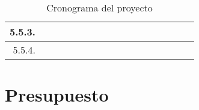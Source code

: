 \documentclass[12pt]{article}
\begin{document}
\begin{table}[H]
{\begin{tabular}{|rllllllllllllllll|}
			\multicolumn{1}{|r|}{5.5.3.}                                       & \multicolumn{1}{l|}{}                          & \multicolumn{1}{l|}{}                          & \multicolumn{1}{l|}{}                          & \multicolumn{1}{l|}{}                          & \multicolumn{1}{l|}{}                          & \multicolumn{1}{l|}{}                          & \multicolumn{1}{l|}{}                          & \multicolumn{1}{l|}{}                          & \multicolumn{1}{l|}{}                          & \multicolumn{1}{l|}{}                           & \multicolumn{1}{l|}{}                           & \multicolumn{1}{l|}{}                           & \multicolumn{1}{c|}{\cellcolor[HTML]{B4A7D6}}   & \multicolumn{1}{c|}{\cellcolor[HTML]{EA9999}}   & \multicolumn{1}{c|}{\cellcolor[HTML]{EA9999}}   & \multicolumn{1}{c|}{\cellcolor[HTML]{EA9999}}   \\ \hline
			\multicolumn{1}{|r|}{5.5.4.}                                       & \multicolumn{1}{l|}{}                          & \multicolumn{1}{l|}{}                          & \multicolumn{1}{l|}{}                          & \multicolumn{1}{l|}{}                          & \multicolumn{1}{l|}{}                          & \multicolumn{1}{l|}{}                          & \multicolumn{1}{l|}{}                          & \multicolumn{1}{l|}{}                          & \multicolumn{1}{l|}{}                          & \multicolumn{1}{l|}{}                           & \multicolumn{1}{l|}{}                           & \multicolumn{1}{c|}{\cellcolor[HTML]{B4A7D6}}   & \multicolumn{1}{c|}{\cellcolor[HTML]{B4A7D6}}   & \multicolumn{1}{c|}{\cellcolor[HTML]{EA9999}}   & \multicolumn{1}{c|}{\cellcolor[HTML]{EA9999}}   & \multicolumn{1}{c|}{\cellcolor[HTML]{EA9999}}   \\ \hline
		\end{tabular}%
	}
	\caption[Tabla]{Cronograma del proyecto}
	\label{tab:cron}
\end{table}

\pagebreak

\section{Presupuesto}
\end{document}
